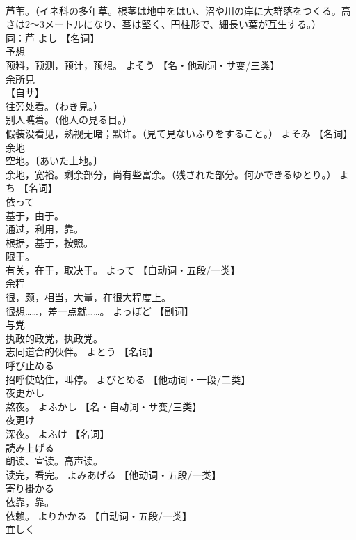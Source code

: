\documentclass[8pt]{extreport}
\begin{document}
\begin{CJK}{UTF8}{min}
\\	芦苇。（イネ科の多年草。根茎は地中をはい、沼や川の岸に大群落をつくる。高さは2～3メートルになり、茎は堅く、円柱形で、細長い葉が互生する。） 
\\	同：芦	よし		【名词】
\\	予想	
\\	预料，预测，预计，预想。	よそう		【名・他动词・サ变/三类】
\\	余所見	
\\	【自サ】 
\\	往旁处看。（わき見。） 
\\	别人瞧着。（他人の見る目。） 
\\	假装没看见，熟视无睹；默许。（見て見ないふりをすること。）	よそみ		【名词】
\\	余地	
\\	空地。〔あいた土地。〕 
\\	余地，宽裕。剩余部分，尚有些富余。（残された部分。何かできるゆとり。）	よち		【名词】
\\	依って	
\\	基于，由于。 
\\	通过，利用，靠。 
\\	根据，基于，按照。 
\\	限于。 
\\	有关，在于，取决于。	よって		【自动词・五段/一类】
\\	余程	
\\	很，颇，相当，大量，在很大程度上。 
\\	很想……，差一点就……。	よっぽど		【副词】
\\	与党	
\\	执政的政党，执政党。 
\\	志同道合的伙伴。	よとう		【名词】
\\	呼び止める	
\\	招呼使站住，叫停。	よびとめる		【他动词・一段/二类】
\\	夜更かし	
\\	熬夜。	よふかし		【名・自动词・サ变/三类】
\\	夜更け	
\\	深夜。	よふけ		【名词】
\\	読み上げる	
\\	朗读、宣读。高声读。 
\\	读完，看完。	よみあげる		【他动词・五段/一类】
\\	寄り掛かる	
\\	依靠，靠。 
\\	依赖。	よりかかる		【自动词・五段/一类】
\\	宜しく	

\end{CJK}
\end{document}
